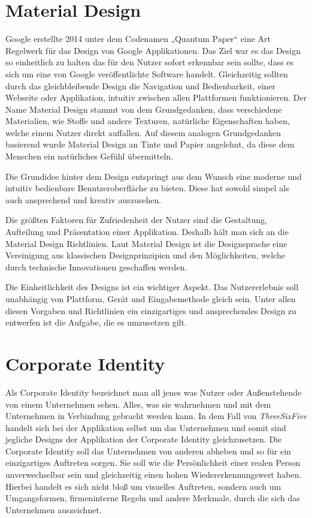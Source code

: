 \section{Material Design}

Google erstellte 2014 unter dem Codenamen „Quantum Paper“ eine Art Regelwerk für das Design von Google Applikationen. Das Ziel war es das Design so einheitlich zu halten das für den Nutzer sofort erkennbar sein sollte, dass es sich um eine von Google veröffentlichte Software handelt. Gleichzeitig sollten durch das gleichbleibende Design die Navigation und Bedienbarkeit, einer Webseite oder Applikation, intuitiv zwischen allen Plattformen funktionieren. Der Name Material Design\cite{MaterialDesign} stammt von dem Grundgedanken, dass verschiedene Materialien, wie Stoffe und andere Texturen, natürliche Eigenschaften haben, welche einem Nutzer direkt auffallen. Auf diesem analogen Grundgedanken basierend wurde Material Design an Tinte und Papier angelehnt, da diese dem Menschen ein natürliches Gefühl übermitteln.

Die Grundidee hinter dem Design entspringt aus dem Wunsch eine moderne und intuitiv bedienbare Benutzeroberfläche zu bieten. Diese hat sowohl simpel als auch ansprechend und kreativ auszusehen.

Die größten Faktoren für Zufriedenheit der Nutzer sind die Gestaltung, Aufteilung und Präsentation einer Applikation. Deshalb hält man sich an die Material Design Richtlinien. Laut Material Design ist die Designsprache eine Vereinigung aus klassischen Designprinzipien und den Möglichkeiten, welche durch technische Innovationen geschaffen werden.

Die Einheitlichkeit des Designs ist ein wichtiger Aspekt. Das Nutzererlebnis soll unabhängig von Plattform, Gerät und Eingabemethode gleich sein.
Unter allen diesen Vorgaben und Richtlinien ein einzigartiges und ansprechendes Design zu entwerfen ist die Aufgabe, die es umzusetzen gilt.


\section{Corporate Identity}

Als Corporate Identity\cite{CorporateIdentity} bezeichnet man all jenes was Nutzer oder Außenstehende von einem Unternehmen sehen. Alles, was sie wahrnehmen und mit dem Unternehmen in Verbindung gebracht werden kann. In dem Fall von \textit{ThreeSixFive} handelt sich bei der Applikation selbst um das Unternehmen und somit sind jegliche Designs der Applikation der Corporate Identity gleichzusetzen. Die Corporate Identity soll das Unternehmen von anderen abheben und so für ein einzigartiges Auftreten sorgen. Sie soll wie die Persönlichkeit einer realen Person unverwechselbar sein und gleichzeitig einen hohen Wiedererkennungswert haben. Hierbei handelt es sich nicht bloß um visuelles Auftreten, sondern auch um Umgangsformen, firmeninterne Regeln und andere Merkmale, durch die sich das Unternehmen auszeichnet.

